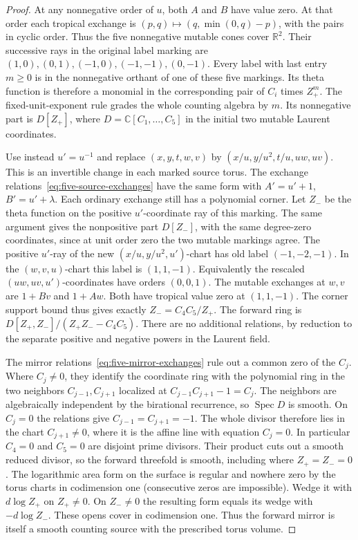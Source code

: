 \documentclass[11pt,reqno]{amsart}
\numberwithin{equation}{section}
\theoremstyle{definition}
\theoremstyle{remark}
\DeclareMathOperator{\Spec}{Spec}
\begin{document}
\begin{proof}
At any nonnegative order of \(u\), both \(A\) and \(B\) have
value zero. At that order each tropical exchange is
\((p,q)\mapsto(q,\min(0,q)-p)\), with the pairs in cyclic order.
Thus the five nonnegative mutable cones cover \(\mathbb R^2\). Their successive rays in the original label marking are
\((1,0),(0,1),(-1,0),(-1,-1),(0,-1)\).
Every label with last entry \(m\ge0\) is in the nonnegative
orthant of one of these five markings. Its theta function is
therefore a monomial in the corresponding pair of \(C_i\) times
\(Z_+^m\). The fixed-unit-exponent rule grades the whole counting
algebra by \(m\). Its nonnegative part is \(D[Z_+]\), where
\(D=\mathbb C[C_1,\ldots,C_5]\) in the initial two mutable Laurent
coordinates.

Use instead \(u'=u^{-1}\) and replace \((x,y,t,w,v)\) by
\((x/u,y/u^2,t/u,uw,uv)\). This is an invertible change in each
marked source torus. The exchange relations~\eqref{eq:five-source-exchanges} have the same form with
\(A'=u'+1\), \(B'=u'+\lambda\). Each ordinary exchange still has
a polynomial corner. Let \(Z_-\) be the theta function on the positive
\(u'\)-coordinate ray of this marking. The same argument gives the
nonpositive part \(D[Z_-]\), with the same degree-zero coordinates, since at unit
order zero the two mutable markings agree. The positive \(u'\)-ray
of the new \((x/u,y/u^2,u')\)-chart has old label \((-1,-2,-1)\).
In the \((w,v,u)\)-chart this label is \((1,1,-1)\). Equivalently the rescaled \((uw,uv,u')\)-coordinates have
orders \((0,0,1)\). The mutable exchanges at \(w,v\) are
\(1+Bv\) and \(1+Aw\). Both have tropical value zero at
\((1,1,-1)\). The corner support bound thus gives exactly
\(Z_-=C_4 C_5/Z_+\). The forward ring is
$D[Z_+,Z_-]/(Z_+Z_--C_4C_5)$.
There are no additional relations, by reduction to the separate
positive and negative powers in the Laurent field.

The mirror relations~\eqref{eq:five-mirror-exchanges} rule out a common zero of the \(C_j\). Where
\(C_j\ne0\), they identify the coordinate ring with the polynomial
ring in the two neighbors \(C_{j-1},C_{j+1}\) localized at
\(C_{j-1}C_{j+1}-1=C_j\). The neighbors are algebraically independent
by the birational recurrence, so \(\Spec D\) is smooth. On \(C_j=0\)
the relations give \(C_{j-1}=C_{j+1}=-1\). The whole divisor
therefore lies in the chart \(C_{j+1}\ne0\), where it is the affine
line with equation \(C_j=0\). In particular \(C_4=0\) and \(C_5=0\)
are disjoint prime divisors. Their
product cuts out a smooth reduced divisor, so the forward
threefold is smooth, including where \(Z_+=Z_-=0\). The logarithmic
area form on the surface is regular and nowhere zero by the torus
charts in codimension one (consecutive zeros are impossible).
Wedge it with \(d\log Z_+\) on \(Z_+\ne0\). On \(Z_-\ne0\)
the resulting form equals its wedge with \(-d\log Z_-\). These opens cover in
codimension one. Thus the forward mirror is itself a smooth counting
source with the prescribed torus volume.


\end{proof}
\end{document}

